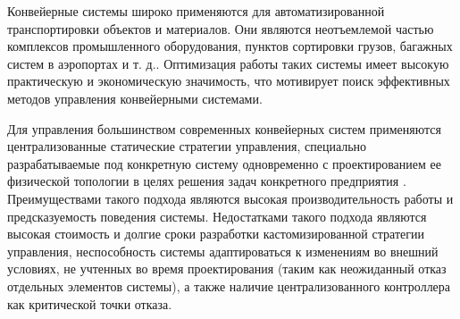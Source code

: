 \documentclass[specification,annotation,times]{itmo-student-thesis}
\theoremstyle{definition}
\begin{document}
\researchpublications{
\begin{refsection}
\nocite{mukhutdinov2019multi}
\nocite{mukhutdinov2019kmu}
\printannobibliography
\end{refsection}
}


\tableofcontents

\startprefacepage

Конвейерные системы широко применяются для автоматизированной транспортировки
объектов и материалов. Они являются неотъемлемой частью комплексов промышленного
оборудования, пунктов сортировки грузов, багажных систем в аэропортах и т. д..
Оптимизация работы таких системы имеет высокую практическую и экономическую
значимость, что мотивирует поиск эффективных методов управления конвейерными
системами.

Для управления большинством современных конвейерных систем применяются
централизованные статические стратегии управления, специально разрабатываемые
под конкретную систему одновременно с проектированием ее физической топологии в
целях решения задач конкретного предприятия \cite{de1994baggage}. Преимуществами
такого подхода являются высокая производительность работы и предсказуемость
поведения системы. Недостатками такого подхода являются высокая стоимость и
долгие сроки разработки кастомизированной стратегии управления, неспособность
системы адаптироваться к изменениям во внешний условиях, не учтенных во время
проектирования (таким как неожиданный отказ отдельных элементов системы), а
также наличие централизованного контроллера как критической точки отказа.
\end{document}
